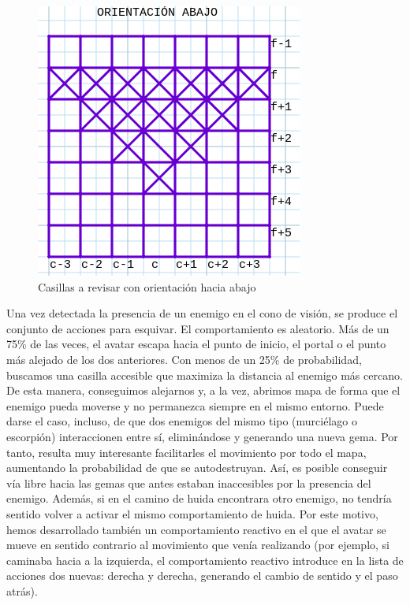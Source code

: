 \begin{figure}[H] %
	\centering
	\includegraphics[scale=0.6]{or-abaj.png}  %
	\caption{Casillas a revisar con orientación hacia abajo} 
	\label{fig:orientación-abaj}
\end{figure}

Una vez detectada la presencia de un enemigo en el cono de visión, se produce el conjunto de acciones para esquivar. El comportamiento es aleatorio. Más de un 75\% de las veces, el avatar escapa hacia el punto de inicio, el portal o el punto más alejado de los dos anteriores. Con menos de un 25\% de probabilidad, buscamos una casilla accesible que maximiza la distancia al enemigo más cercano. De esta manera, conseguimos alejarnos y, a la vez, abrimos mapa de forma que el enemigo pueda moverse y no permanezca siempre en el mismo entorno. Puede darse el caso, incluso, de que dos enemigos del mismo tipo (murciélago o escorpión) interaccionen entre sí, eliminándose y generando una nueva gema. Por tanto, resulta muy interesante facilitarles el movimiento por todo el mapa, aumentando la probabilidad de que se autodestruyan. Así, es posible conseguir vía libre hacia las gemas que antes estaban inaccesibles por la presencia del enemigo. Además, si en el camino de huida encontrara otro enemigo, no tendría sentido volver a activar el mismo comportamiento de huida. Por este motivo, hemos desarrollado también un comportamiento reactivo en el que el avatar se mueve en sentido contrario al movimiento que venía realizando (por ejemplo, si caminaba hacia a la izquierda, el comportamiento reactivo introduce en la lista de acciones dos nuevas: derecha y derecha, generando el cambio de sentido y el paso atrás).


